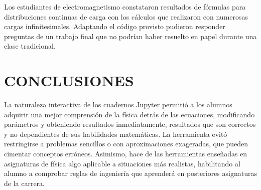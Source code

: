 \documentclass[a4paper]{fodami}        %
\begin{document}
Los estudiantes de electromagnetismo constataron resultados de fórmulas para distribuciones continuas de carga con los cálculos que realizaron con numerosas cargas infinitesimales.
Adaptando el código provisto pudieron responder preguntas de un trabajo final que no podrían haber resuelto en papel durante una clase tradicional. 



\section{CONCLUSIONES}

La naturaleza interactiva de los cuadernos Jupyter permitió a los alumnos adquirir una mejor comprensión de la física detrás de las ecuaciones, modificando parámetros y obteniendo resultados inmediatamente, resultados que son correctos y no dependientes de sus habilidades matemáticas.
La herramienta evitó restringirse a problemas sencillos o con aproximaciones exageradas, que pueden cimentar conceptos erróneos.
Asimismo, hace de las herramientas enseñadas en asignaturas de física algo aplicable a situaciones más realistas, habilitando al alumno a comprobar reglas de ingeniería que aprenderá en posteriores asignaturas de la carrera.

\end{document}
